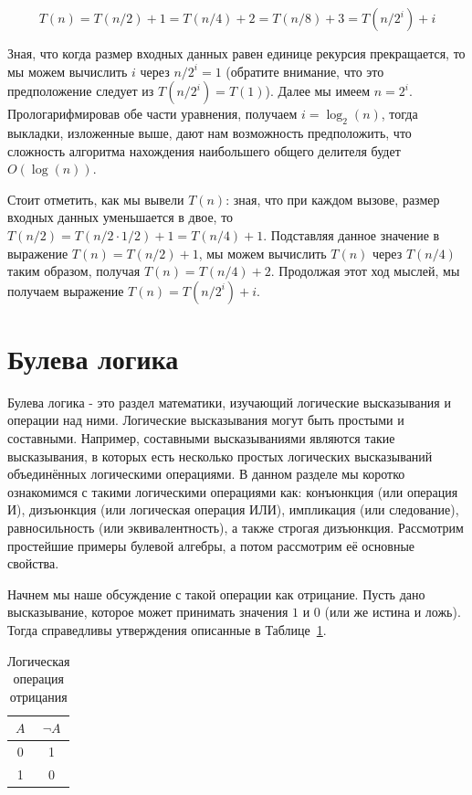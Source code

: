 $$T(n) = T(n/2) + 1 = 
	 T(n/4) + 2 = 
         T(n/8) + 3 = 
	 T(n/2^i) + i
$$

Зная, что когда размер входных данных равен единице рекурсия прекращается, то мы можем вычислить
$i$ через $n/2^i=1$ (обратите внимание, что это предположение следует из $T(n/2^i)=T(1)$). 
Далее мы имеем $n=2^i$. Прологарифмировав обе части уравнения, получаем
$i=\log_2(n)$, тогда выкладки, изложенные выше, дают нам возможность предположить, что сложность
алгоритма нахождения наибольшего общего делителя будет $O(\log(n))$.

Стоит отметить, как мы вывели $T(n)$: зная, что при каждом вызове, размер входных данных уменьшается в
двое, то $T(n/2) = T(n/2\cdot1/2) + 1 = T(n/4)+1$. Подставляя данное значение в выражение 
$T(n) = T(n/2) + 1$, мы можем вычислить $T(n)$ через $T(n/4)$ таким образом, получая $T(n)=T(n/4)+2$.
Продолжая этот ход мыслей, мы получаем выражение $T(n)=T(n/2^i) + i$.

\section{Булева логика}

Булева логика - это раздел математики, изучающий логические высказывания и операции над ними.
Логические высказывания могут быть простыми и составными. Например, составными высказываниями
являются такие высказывания, в которых есть несколько простых логических высказываний объединённых
логическими операциями. В данном разделе мы коротко ознакомимся с такими логическими операциями как:
конъюнкция (или операция И), дизъюнкция (или логическая операция ИЛИ), импликация (или следование),
равносильность (или эквивалентность), а также строгая дизъюнкция. Рассмотрим простейшие примеры 
булевой алгебры, а потом рассмотрим её основные свойства.

Начнем мы наше обсуждение с такой операции как отрицание. Пусть дано высказывание,
которое может принимать значения $1$ и $0$ (или же истина и ложь). 
Тогда справедливы утверждения описанные в Таблице~\ref{tab:negation}.

\begin{table}[!h]
\centering
\begin{tabular}{|c|c|}
\hline
$A$ & $\neg A$ \\\hline
0   & 1 \\\hline
1   & 0 \\\hline
\end{tabular}
\caption{Логическая операция отрицания}
\label{tab:negation}
\end{table}

